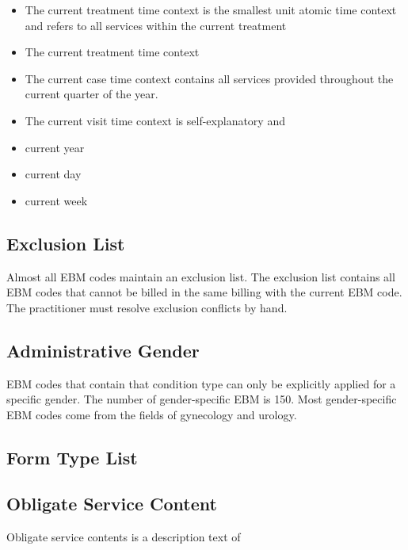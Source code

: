 \begin{itemize}
    \item The current treatment time context is the smallest unit atomic time context and refers to all services within the current treatment
    \item The current treatment time context 
    \item The current case time context contains all services provided throughout the current quarter of the year.
    \item The current visit time context is self-explanatory and
    \item current year
    \item current day
    \item current week
\end{itemize}

\subsection{Exclusion List}\label{subsec:exclusion-list}
Almost all EBM codes maintain an exclusion list.
The exclusion list contains all EBM codes that cannot be billed in the same billing with the current EBM code.
The practitioner must resolve exclusion conflicts by hand.

\subsection{Administrative Gender}\label{subsec:administrative-gender}
EBM codes that contain that condition type can only be explicitly applied for a specific gender.
The number of gender-specific EBM is 150.
Most gender-specific EBM codes come from the fields of gynecology and urology.

\subsection{Form Type List}\label{subsec:form-type-list}

\subsection{Obligate Service Content}\label{subsec:obligate-service-content}
Obligate service contents is a description text of \todo{}

